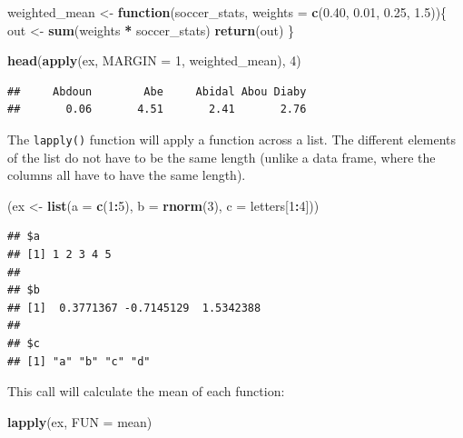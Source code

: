 \documentclass[]{book}
\makeatletter
\newenvironment{Shaded}{\begin{snugshade}}{\end{snugshade}}
\newcommand{\KeywordTok}[1]{\textcolor[rgb]{0.13,0.29,0.53}{\textbf{#1}}}
\newcommand{\DataTypeTok}[1]{\textcolor[rgb]{0.13,0.29,0.53}{#1}}
\newcommand{\DecValTok}[1]{\textcolor[rgb]{0.00,0.00,0.81}{#1}}
\newcommand{\FloatTok}[1]{\textcolor[rgb]{0.00,0.00,0.81}{#1}}
\newcommand{\StringTok}[1]{\textcolor[rgb]{0.31,0.60,0.02}{#1}}
\newcommand{\ControlFlowTok}[1]{\textcolor[rgb]{0.13,0.29,0.53}{\textbf{#1}}}
\newcommand{\OperatorTok}[1]{\textcolor[rgb]{0.81,0.36,0.00}{\textbf{#1}}}
\newcommand{\NormalTok}[1]{#1}
\newenvironment{kframe}{%
\medskip{}
\setlength{\fboxsep}{.8em}
 \def\at@end@of@kframe{}%
 \ifinner\ifhmode%
  \def\at@end@of@kframe{\end{minipage}}%
  \begin{minipage}{\columnwidth}%
 \fi\fi%
 \def\FrameCommand##1{\hskip\@totalleftmargin \hskip-\fboxsep
 \colorbox{shadecolor}{##1}\hskip-\fboxsep
     \hskip-\linewidth \hskip-\@totalleftmargin \hskip\columnwidth}%
 \MakeFramed {\advance\hsize-\width
   \@totalleftmargin\z@ \linewidth\hsize
   \@setminipage}}%
 {\par\unskip\endMakeFramed%
 \at@end@of@kframe}
\renewenvironment{Shaded}{\begin{kframe}}{\end{kframe}}
\theoremstyle{definition}
\theoremstyle{definition}
\theoremstyle{definition}
\theoremstyle{remark}
\makeatother
\begin{document}
\begin{Shaded}
\begin{Highlighting}[]
\NormalTok{weighted_mean <-}\StringTok{ }\ControlFlowTok{function}\NormalTok{(soccer_stats,}
                          \DataTypeTok{weights =} \KeywordTok{c}\NormalTok{(}\FloatTok{0.40}\NormalTok{, }\FloatTok{0.01}\NormalTok{,}
                                      \FloatTok{0.25}\NormalTok{, }\FloatTok{1.5}\NormalTok{))\{}
\NormalTok{  out <-}\StringTok{ }\KeywordTok{sum}\NormalTok{(weights }\OperatorTok{*}\StringTok{ }\NormalTok{soccer_stats)}
  \KeywordTok{return}\NormalTok{(out)}
\NormalTok{\}}

\KeywordTok{head}\NormalTok{(}\KeywordTok{apply}\NormalTok{(ex, }\DataTypeTok{MARGIN =} \DecValTok{1}\NormalTok{, weighted_mean), }\DecValTok{4}\NormalTok{)}
\end{Highlighting}
\end{Shaded}

\begin{verbatim}
##     Abdoun        Abe     Abidal Abou Diaby 
##       0.06       4.51       2.41       2.76
\end{verbatim}

The \texttt{lapply()} function will apply a function across a list. The
different elements of the list do not have to be the same length (unlike
a data frame, where the columns all have to have the same length).

\begin{Shaded}
\begin{Highlighting}[]
\NormalTok{(ex <-}\StringTok{ }\KeywordTok{list}\NormalTok{(}\DataTypeTok{a =} \KeywordTok{c}\NormalTok{(}\DecValTok{1}\OperatorTok{:}\DecValTok{5}\NormalTok{), }\DataTypeTok{b =} \KeywordTok{rnorm}\NormalTok{(}\DecValTok{3}\NormalTok{), }\DataTypeTok{c =}\NormalTok{ letters[}\DecValTok{1}\OperatorTok{:}\DecValTok{4}\NormalTok{]))}
\end{Highlighting}
\end{Shaded}

\begin{verbatim}
## $a
## [1] 1 2 3 4 5
## 
## $b
## [1]  0.3771367 -0.7145129  1.5342388
## 
## $c
## [1] "a" "b" "c" "d"
\end{verbatim}

This call will calculate the mean of each function:

\begin{Shaded}
\begin{Highlighting}[]
\KeywordTok{lapply}\NormalTok{(ex, }\DataTypeTok{FUN =}\NormalTok{ mean)}
\end{Highlighting}
\end{Shaded}
\end{document}
